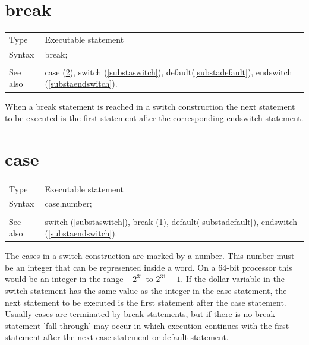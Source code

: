 \section{break}
\label{substabreak}

\noindent \begin{tabular}{ll}
Type & Executable statement\\
Syntax & break; \\
\\ See also & case (\ref{substacase}), switch (\ref{substaswitch}),
		 default(\ref{substadefault}), endswitch (\ref{substaendswitch}).
\end{tabular} \vspace{4mm}

\noindent When a break statement is reached in a switch construction the 
next statement to be executed is the first statement after the 
corresponding endswitch statement.

\vspace{10mm}
%
%
\section{case}
\label{substacase}

\noindent \begin{tabular}{ll}
Type & Executable statement\\
Syntax & case,number; \\
\\ See also & switch (\ref{substaswitch}), break (\ref{substabreak}),
		 default(\ref{substadefault}), endswitch (\ref{substaendswitch}).
\end{tabular} \vspace{4mm}

\noindent The cases in a switch construction are marked by a number. This 
number must be an integer that can be represented inside a {\FORM} word. 
On a 64-bit processor this would be an integer in the range $-2^{31}$ to 
$2^{31}-1$. If the dollar variable in the switch statement has the same 
value as the integer in the case statement, the next statement to be 
executed is the first statement after the case statement. Usually cases are 
terminated by break statements, but if there is no break statement 'fall 
through' may occur in which execution continues with the first statement 
after the next case statement or default statement.

\vspace{10mm}
%

